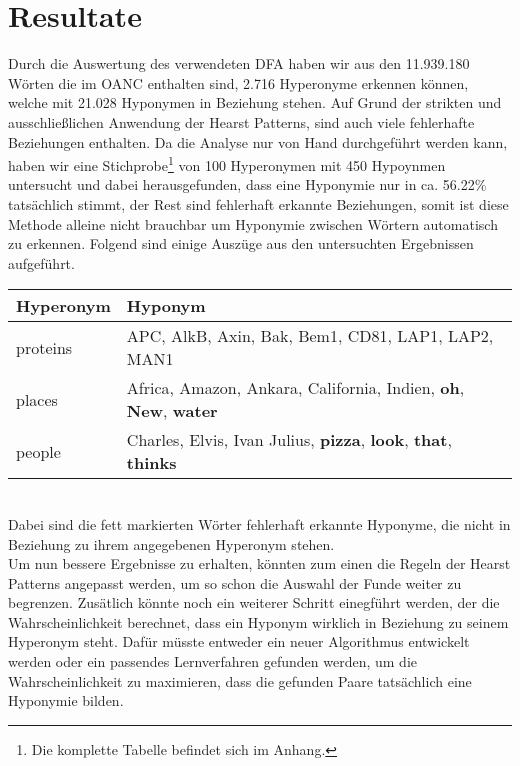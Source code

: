 \section{Resultate}%
%
Durch die Auswertung des verwendeten DFA haben wir aus den 11.939.180 Wörten
die im OANC enthalten sind, 2.716 Hyperonyme erkennen können, welche
mit 21.028 Hyponymen in Beziehung stehen. Auf Grund der strikten und ausschließlichen
Anwendung der Hearst Patterns, sind auch viele fehlerhafte
Beziehungen enthalten. Da die Analyse nur von Hand durchgeführt werden
kann, haben wir eine Stichprobe\footnote{Die komplette Tabelle
  befindet sich im Anhang.} von 100 Hyperonymen mit 450 Hypoynmen
untersucht und dabei herausgefunden, dass eine Hyponymie nur in ca.
56.22\% tatsächlich stimmt, der Rest sind fehlerhaft erkannte
Beziehungen, somit ist diese Methode alleine nicht brauchbar um
Hyponymie zwischen Wörtern automatisch zu erkennen. Folgend sind einige
Auszüge aus den untersuchten Ergebnissen aufgeführt.%
%
\begin{longtable}{|l|l|}
  \hline
  \textbf{Hyperonym} & \textbf{Hyponym} \\
  \hline
  proteins & APC, AlkB, Axin, Bak, Bem1, CD81, LAP1,
  LAP2, MAN1 \\
  \hline
  places & Africa, Amazon, Ankara, California, Indien, \textbf{oh},
  \textbf{New}, \textbf{water} \\
  \hline
  people & Charles, Elvis, Ivan Julius,
  \textbf{pizza}, \textbf{look}, \textbf{that}, \textbf{thinks} \\
  \hline
\end{longtable}%
~\\%
Dabei sind die fett markierten Wörter fehlerhaft erkannte Hyponyme,
die nicht in Beziehung zu ihrem angegebenen Hyperonym stehen.%
\\%
Um nun bessere Ergebnisse zu erhalten, könnten zum einen die Regeln
der Hearst Patterns angepasst werden, um so schon die Auswahl der
Funde weiter zu begrenzen. Zusätlich könnte noch ein weiterer
Schritt einegführt werden, der die Wahrscheinlichkeit berechnet, dass
ein Hyponym wirklich in Beziehung zu seinem Hyperonym steht. Dafür
müsste entweder ein neuer Algorithmus entwickelt werden oder ein
passendes Lernverfahren gefunden werden, um die Wahrscheinlichkeit zu
maximieren, dass die gefunden Paare tatsächlich eine Hyponymie bilden.
